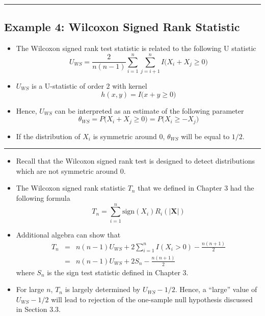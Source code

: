 \documentclass[]{book}
\begin{document}
\begin{center}\rule{0.5\linewidth}{\linethickness}\end{center}

\hypertarget{example-4-wilcoxon-signed-rank-statistic}{%
\subsection{Example 4: Wilcoxon Signed Rank Statistic}\label{example-4-wilcoxon-signed-rank-statistic}}

\begin{itemize}
\item
  The Wilcoxon signed rank test statistic is related to the following U statistic
  \begin{equation}
  U_{WS} = \frac{2}{n(n-1)}\sum_{i=1}^{n}\sum_{j=i+1}^{n} I\Big( X_{i} + X_{j} \geq 0 \Big)  \nonumber
  \end{equation}
\item
  \(U_{WS}\) is a U-statistic of order \(2\) with kernel
  \begin{equation}
  h(x, y) = I\Big( x + y \geq 0\Big)  \nonumber
  \end{equation}
\item
  Hence, \(U_{WS}\) can be interpreted as an estimate of
  the following parameter
  \begin{equation}
  \theta_{WS} = P\Big( X_{i} + X_{j} \geq 0  \Big) = P\Big( X_{i} \geq -X_{j} \Big)  \nonumber
  \end{equation}
\item
  If the distribution of \(X_{i}\) is symmetric around \(0\), \(\theta_{WS}\) will be equal
  to \(1/2\).
\end{itemize}

\begin{center}\rule{0.5\linewidth}{\linethickness}\end{center}

\begin{itemize}
\item
  Recall that the Wilcoxon signed rank test is designed to detect
  distributions which are not symmetric around \(0\).
\item
  The Wilcoxon signed rank statistic \(T_{n}\) that we defined in Chapter 3 had the following formula
  \begin{equation}
  T_{n} = \sum_{i=1}^{n} \textrm{sign}( X_{i}) R_{i}( |\mathbf{X}| ) \nonumber
  \end{equation}
\item
  Additional algebra can show that
  \begin{eqnarray}
  T_{n} &=& n(n-1) U_{WS} + 2\sum_{i=1}^{n} I(X_{i} > 0) - \frac{n(n+1)}{2} \nonumber \\
  &=& n(n-1) U_{WS} + 2 S_{n} - \frac{n(n+1)}{2} 
  \label{eq:wilcoxsign-equivalence}
  \end{eqnarray}
  where \(S_{n}\) is the sign test statistic defined in Chapter 3.
\item
  For large \(n\), \(T_{n}\) is largely determined by \(U_{WS} - 1/2\).
  Hence, a ``large'' value of \(U_{WS} - 1/2\) will lead to rejection
  of the one-sample null hypothesis discussed in Section 3.3.
\end{itemize}
\end{document}
